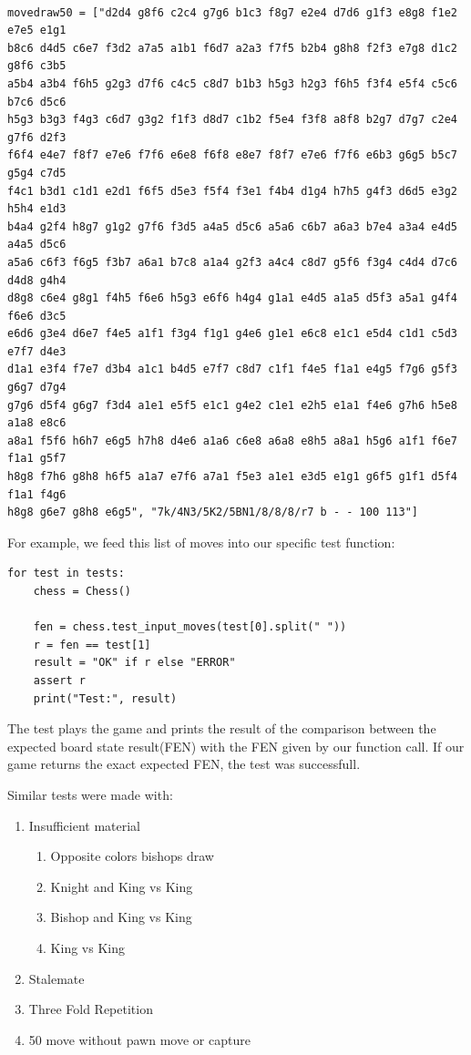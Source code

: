\documentclass[10pt]{article}
\begin{document}
\begin{lstlisting}

movedraw50 = ["d2d4 g8f6 c2c4 g7g6 b1c3 f8g7 e2e4 d7d6 g1f3 e8g8 f1e2 e7e5 e1g1
b8c6 d4d5 c6e7 f3d2 a7a5 a1b1 f6d7 a2a3 f7f5 b2b4 g8h8 f2f3 e7g8 d1c2 g8f6 c3b5
a5b4 a3b4 f6h5 g2g3 d7f6 c4c5 c8d7 b1b3 h5g3 h2g3 f6h5 f3f4 e5f4 c5c6 b7c6 d5c6
h5g3 b3g3 f4g3 c6d7 g3g2 f1f3 d8d7 c1b2 f5e4 f3f8 a8f8 b2g7 d7g7 c2e4 g7f6 d2f3
f6f4 e4e7 f8f7 e7e6 f7f6 e6e8 f6f8 e8e7 f8f7 e7e6 f7f6 e6b3 g6g5 b5c7 g5g4 c7d5
f4c1 b3d1 c1d1 e2d1 f6f5 d5e3 f5f4 f3e1 f4b4 d1g4 h7h5 g4f3 d6d5 e3g2 h5h4 e1d3
b4a4 g2f4 h8g7 g1g2 g7f6 f3d5 a4a5 d5c6 a5a6 c6b7 a6a3 b7e4 a3a4 e4d5 a4a5 d5c6
a5a6 c6f3 f6g5 f3b7 a6a1 b7c8 a1a4 g2f3 a4c4 c8d7 g5f6 f3g4 c4d4 d7c6 d4d8 g4h4
d8g8 c6e4 g8g1 f4h5 f6e6 h5g3 e6f6 h4g4 g1a1 e4d5 a1a5 d5f3 a5a1 g4f4 f6e6 d3c5
e6d6 g3e4 d6e7 f4e5 a1f1 f3g4 f1g1 g4e6 g1e1 e6c8 e1c1 e5d4 c1d1 c5d3 e7f7 d4e3
d1a1 e3f4 f7e7 d3b4 a1c1 b4d5 e7f7 c8d7 c1f1 f4e5 f1a1 e4g5 f7g6 g5f3 g6g7 d7g4
g7g6 d5f4 g6g7 f3d4 a1e1 e5f5 e1c1 g4e2 c1e1 e2h5 e1a1 f4e6 g7h6 h5e8 a1a8 e8c6
a8a1 f5f6 h6h7 e6g5 h7h8 d4e6 a1a6 c6e8 a6a8 e8h5 a8a1 h5g6 a1f1 f6e7 f1a1 g5f7
h8g8 f7h6 g8h8 h6f5 a1a7 e7f6 a7a1 f5e3 a1e1 e3d5 e1g1 g6f5 g1f1 d5f4 f1a1 f4g6
h8g8 g6e7 g8h8 e6g5", "7k/4N3/5K2/5BN1/8/8/8/r7 b - - 100 113"]

\end{lstlisting}

For example, we feed this list of moves into our specific test function:

\begin{lstlisting}
for test in tests:
    chess = Chess()

    fen = chess.test_input_moves(test[0].split(" "))
    r = fen == test[1]
    result = "OK" if r else "ERROR"
    assert r
    print("Test:", result)

\end{lstlisting}

The test plays the game and prints the result of the comparison between the expected board state
result(FEN) with the FEN given by our function call. If our game returns the
exact expected FEN, the test was successfull.

Similar tests were made with:
\begin{enumerate}[label=\arabic*)]
\item Insufficient material
    \begin{enumerate}[label=\arabic{enumii}.\arabic*)]
    \item Opposite colors bishops draw
    \item Knight and King vs King
    \item Bishop and King vs King
    \item King vs King
    \end{enumerate}
    
    \item Stalemate 
    \item Three Fold Repetition
    \item 50 move without pawn move or capture
\end{enumerate}
\end{document}
